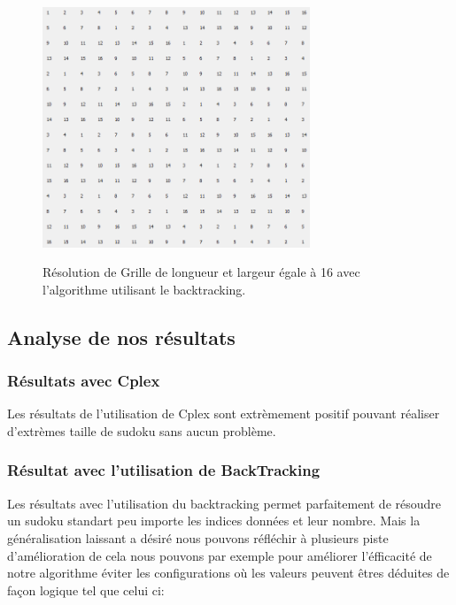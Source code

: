 \begin{figure}[h]
  \begin{center}
\includegraphics[width=8cm]{./images/Resultat_16_Back.png}\label{Test_Back_16_16}
\caption{Résolution de Grille de longueur et largeur égale à 16 avec l'algorithme utilisant le backtracking.}
\end{center}
\end{figure}

\subsection{Analyse de nos résultats}

\subsubsection{Résultats avec Cplex}

Les résultats de l'utilisation de Cplex sont extrèmement positif pouvant réaliser d'extrèmes taille de sudoku sans aucun problème.

\subsubsection{Résultat avec l'utilisation de BackTracking}

Les résultats avec l'utilisation du backtracking permet parfaitement de résoudre un sudoku standart peu importe les indices données et leur nombre. Mais la généralisation laissant a désiré nous pouvons réfléchir à plusieurs piste d'amélioration de cela nous pouvons par exemple pour améliorer l'éfficacité de notre algorithme éviter les configurations où les valeurs peuvent êtres déduites de façon logique tel que celui ci:

